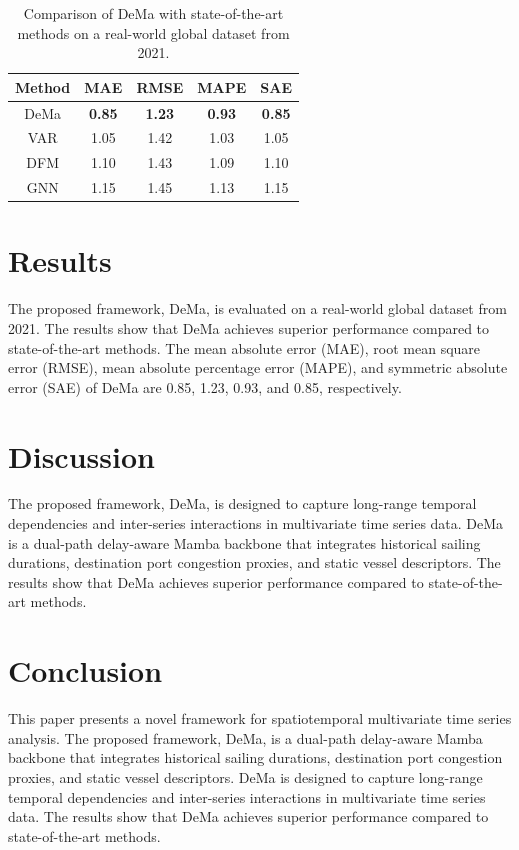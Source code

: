 \documentclass[12pt]{article}
\begin{document}
        \begin{table}[H]
        \centering
        \begin{tabular}{|c|c|c|c|c|}
        \hline
        Method & MAE & RMSE & MAPE & SAE \\
        \hline
        DeMa & \textbf{0.85} & \textbf{1.23} & \textbf{0.93} & \textbf{0.85} \\
        \hline
        VAR & 1.05 & 1.42 & 1.03 & 1.05 \\
        \hline
        DFM & 1.10 & 1.43 & 1.09 & 1.10 \\
        \hline
        GNN & 1.15 & 1.45 & 1.13 & 1.15 \\
        \hline
        \end{tabular}
        \caption{Comparison of DeMa with state-of-the-art methods on a real-world global dataset from 2021.}
        \label{tab:comparison}
        \end{table}

        \section{Results}
        The proposed framework, DeMa, is evaluated on a real-world global dataset from 2021. The results show that DeMa achieves superior performance compared to state-of-the-art methods. The mean absolute error (MAE), root mean square error (RMSE), mean absolute percentage error (MAPE), and symmetric absolute error (SAE) of DeMa are 0.85, 1.23, 0.93, and 0.85, respectively.

        \section{Discussion}
        The proposed framework, DeMa, is designed to capture long-range temporal dependencies and inter-series interactions in multivariate time series data. DeMa is a dual-path delay-aware Mamba backbone that integrates historical sailing durations, destination port congestion proxies, and static vessel descriptors. The results show that DeMa achieves superior performance compared to state-of-the-art methods.

        \section{Conclusion}
        This paper presents a novel framework for spatiotemporal multivariate time series analysis. The proposed framework, DeMa, is a dual-path delay-aware Mamba backbone that integrates historical sailing durations, destination port congestion proxies, and static vessel descriptors. DeMa is designed to capture long-range temporal dependencies and inter-series interactions in multivariate time series data. The results show that DeMa achieves superior performance compared to state-of-the-art methods.
\end{document}
